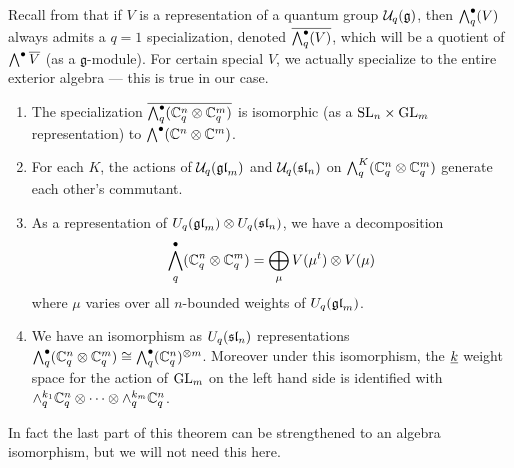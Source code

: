 \documentclass[10pt,leqno]{article}
\begin{document}
Recall from \cite{BW} that if $ V $ is a representation of a quantum group $ \Uq(\mathfrak{g}) $, then $ \Alt^\bullet_q(V) $ always admits a $ q=1 $ specialization, denoted $ \overline{\Alt^\bullet_q(V)}$, which will be a quotient of $ \Alt^\bullet \overline{V} $ (as a $ \mathfrak{g}$-module).  For certain special $ V $, we actually specialize to the entire exterior algebra --- this is true in our case.

\begin{thm} \label{th:qSkewHowe}
\begin{enumerate}
\item The specialization $\overline{\Alt^\bullet_q(\bC_q^n \otimes \bC_q^m)} $ is isomorphic (as a $ \SL_n \times \GL_m $ representation) to $ \Alt^\bullet(\bC^n \otimes \bC^m) $.
\item For each $ K $, the actions of $ \Uq(\gl_m) $ and $ \Uq(\sl_n) $ on $ \Alt^K_q(\bC_q^n \otimes \bC_q^m) $ generate each other's commutant.
\item As a representation of $ U_q(\gl_m) \otimes U_q(\sl_n)  $, we have a decomposition
$$ \Alt^\bullet_q (\mathbb C^n_q \otimes \mathbb C^m_q) = \bigoplus_{\mu} V(\mu^t) \otimes V(\mu) $$
 where $\mu$ varies over all $n$-bounded weights of $ U_q(\gl_m)$.
\item We have an isomorphism as $ U_q(\sl_n) $ representations 
$ \Alt^\bullet_q(\mathbb C^n_q \otimes \mathbb C^m_q) \cong \Alt^\bullet_q(\bC_q^n)^{\otimes m} $.  Moreover under this isomorphism, the $ \ul{k} $ weight space for the action of $ \GL_m $ on the left hand side is identified with $\alt^{k_1}_q \mathbb C_q^n \otimes \cdots \otimes \alt^{k_m}_q \mathbb C_q^n$.
\end{enumerate}
\end{thm}

In fact the last part of this theorem can be strengthened to an algebra isomorphism, but we will not need this here.
\end{document}

